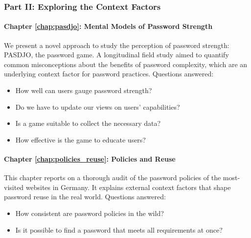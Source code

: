 \subsubsection{Part II: Exploring the Context Factors}
\paragraph{Chapter \ref{chap:pasdjo}: Mental Models of Password Strength} %
We present a novel approach to study the perception of password strength: PASDJO, the password game. A longitudinal field study aimed to quantify common misconceptions about the benefits of password complexity, which are an underlying context factor for password practices. 
Questions answered: \vspace*{-5pt} \begin{itemize}[leftmargin=*,itemsep=-5pt]
	\item How well can users gauge password strength? 
	\item Do we have to update our views on users' capabilities?
	\item Is a game suitable to collect the necessary data?
	\item How effective is the game to educate users?
\end{itemize}

\paragraph{Chapter \ref{chap:policies_reuse}: Policies and Reuse} %
This chapter reports on a thorough audit of the password policies of the most-visited websites in Germany. It explains  external context factors that shape password reuse in the real world.
Questions answered: \vspace*{-5pt} \begin{itemize}[leftmargin=*,itemsep=-5pt]
	\item How consistent are password policies in the wild?
	\item Is it possible to find a password that meets all requirements at once?
\end{itemize}


